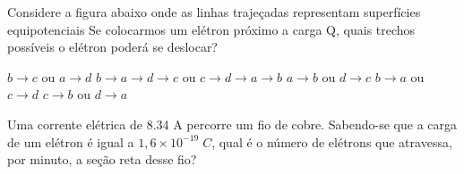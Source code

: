 \documentclass[12pt, addpoints]{exam}
\begin{document}
    \begin{questions}
\begin{multicols*}{2}
\question Considere a figura abaixo onde as linhas trajeçadas representam superfícies equipotenciais Se colocarmos um elétron próximo a carga Q, quais trechos possíveis o elétron poderá se deslocar?
        
        \begin{center}
            \begin{minipage}[c]{0.5\linewidth}
            \end{minipage}
        \end{center}
        
        

\begin{choices}
\choice $b\rightarrow c$ ou $a\rightarrow d$ 
\choice $b\rightarrow a\rightarrow d\rightarrow c$ ou $c\rightarrow d\rightarrow a\rightarrow b$ 
\choice $a\rightarrow b$ ou $d\rightarrow c$ 
\choice $b\rightarrow a$ ou $c\rightarrow d$ 
\choice $c\rightarrow b$ ou $d\rightarrow a$ 
\end{choices}
\question Uma corrente elétrica de    8.34 A percorre um ﬁo de cobre. Sabendo-se que a carga de um elétron é igual a $1,6\times 10^{-19}\;C$, qual é o número de elétrons que atravessa, por minuto, a seção reta desse ﬁo?


\end{multicols*}
\end{questions}
\end{document}
